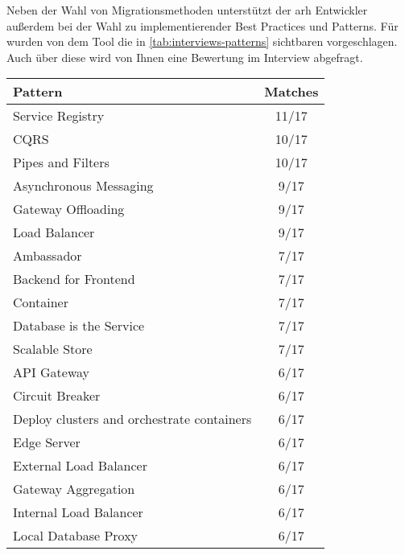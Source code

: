 Neben der Wahl von Migrationsmethoden unterstützt der \gls{arh} Entwickler außerdem bei der Wahl zu implementierender Best Practices und Patterns.
Für \jf wurden von dem Tool die in \cref{tab:interviews-patterns} sichtbaren \bpp vorgeschlagen.
Auch über diese wird von Ihnen eine Bewertung im Interview abgefragt.

\begin{table}[!htb]
	\begin{minipage}{.5\linewidth}
		\centering
		\begin{tabular}{p{5cm} c}
			\toprule
			\textbf{Pattern} & \textbf{Matches} \\ \midrule
			Service Registry                            & 11/17 \\ \hline
			CQRS                                        & 10/17 \\ \hline
			Pipes and Filters                           & 10/17 \\ \hline
			Asynchronous Messaging                      & 9/17 \\ \hline
			Gateway Offloading                          & 9/17 \\ \hline
			Load Balancer                               & 9/17 \\ \hline
			Ambassador                                  & 7/17 \\ \hline
			Backend for Frontend                        & 7/17 \\ \hline
			Container                                   & 7/17 \\ \hline
			Database is the Service                     & 7/17 \\ \hline
			Scalable Store                              & 7/17 \\ \hline
			API Gateway                                 & 6/17 \\ \hline
			Circuit Breaker                             & 6/17 \\ \hline
			Deploy clusters and orchestrate containers  & 6/17 \\ \hline
			Edge Server                                 & 6/17 \\ \hline
			External Load Balancer                      & 6/17 \\ \hline
			Gateway Aggregation                         & 6/17 \\ \hline
			Internal Load Balancer                      & 6/17 \\ \hline
			Local Database Proxy                        & 6/17 \\ \hline

\end{tabular}
\end{minipage}
\end{table}
